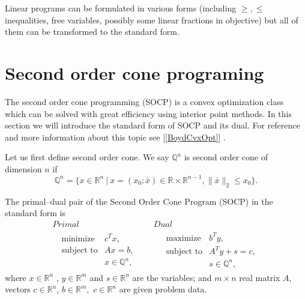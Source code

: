 \documentclass[12pt]{book}
\theoremstyle{definition}
\begin{document}
\rem Linear programs can be formulated in various forms (including $\geq , \leq$ inequalities, free variables, possibly some linear fractions in objective) but all of them can be transformed to the standard form.
%


\section{Second order cone programing}
\label{SectionSOCP}


The second order cone programming (SOCP) is a convex optimization class which can be solved with great efficiency using interior point methods. 
In this section we will introduce the standard form of SOCP and its dual. For reference and more information about this topic see [\ref{BoydCvxOpt}] .


Let us first define second order cone.
\label{defSOC} We say $\mathbb{Q}^n$ is second order cone of dimension $n$ if 
\begin{equation}
\mathbb{Q}^n=\{x\in \mathbb{R}^n \ | \ x = (x_0;\bar{x}) \in \mathbb{R}\times\mathbb{R}^{n-1}, \|\bar{x}\|_2\leq x_0\}.
\end{equation}


\label{defSOCP}
The primal--dual pair of the Second Order Cone Program (SOCP) in the standard form is
\begin{equation}
\label{socp} 
\begin{array}{cc}
Primal & Dual \\
\ \ \ \begin{array}{ll}
\mbox{minimize} & c^Tx,\\
\mbox{subject to}& Ax = b,\\
& x \in \mathbb{Q}^n,
\end{array} 
 \ \ \ \ \ & \ \ \ \ \ 
 \begin{array}{ll}
\mbox{maximize} & b^Ty,\\
\mbox{subject to}& A^Ty + s = c,\\
& s \in \mathbb{Q}^n,
\end{array}
\end{array}
\end{equation}
where $x\in \mathbb{R}^n$ , $y\in \mathbb{R}^m$ and $s\in \mathbb{R}^n$ are the variables; and $m\times n$ real matrix $A$, vectors $c\in \mathbb{R}^n$, $b\in \mathbb{R}^{m},$ $c\in \mathbb{R}^n$ are given problem data.
\end{document}
